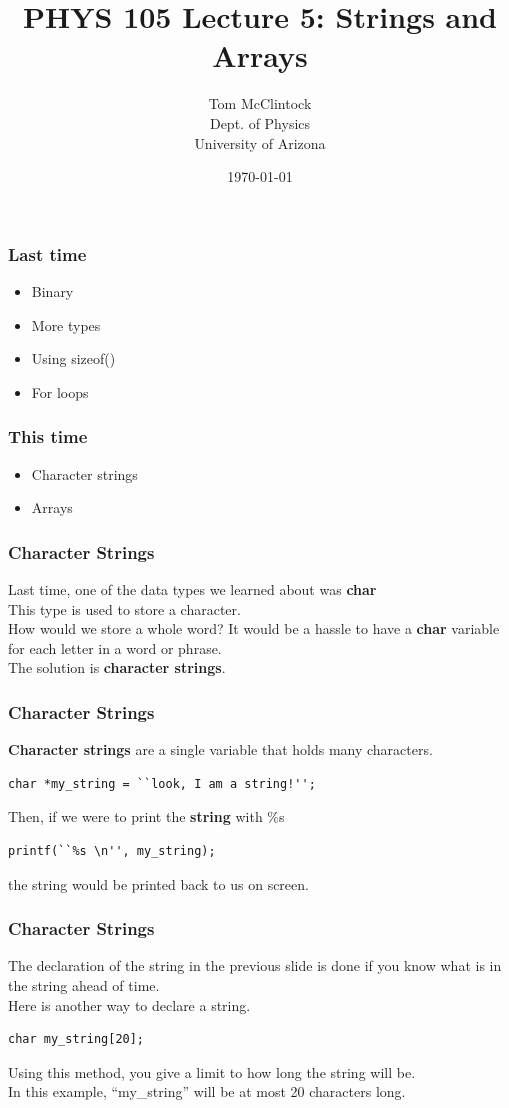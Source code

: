 \documentclass{beamer}
\title{PHYS 105 Lecture 5: Strings and Arrays}
\author{Tom McClintock \\
	Dept. of Physics\\
	University of Arizona
}
\date{\today}
\begin{document}
\begin{frame}
  \titlepage
\end{frame}

\begin{frame}
  \frametitle{Last time}
  \begin{itemize}
    \item Binary
    \item More types
    \item Using sizeof()
    \item For loops
  \end{itemize}
\end{frame}

\begin{frame}
  \frametitle{This time}
  \begin{itemize}
    \item Character strings
    \item Arrays
  \end{itemize}
\end{frame}

\begin{frame}
  \frametitle{Character Strings}
  Last time, one of the data types we learned about was \textbf{char}\\
  This type is used to store a character.\\
  How would we store a whole word? It would be a hassle to have a \textbf{char}
  variable for each letter in a word or phrase.\\
  The solution is \textbf{character strings}.
\end{frame}

\begin{frame}[fragile]
  \frametitle{Character Strings}
  \textbf{Character strings} are a single variable that holds many characters.\\
  \begin{lstlisting}[style=customc]
    char *my_string = ``look, I am a string!'';
  \end{lstlisting}
  Then, if we were to print the \textbf{string} with \%s
  \begin{lstlisting}[style=customc]
    printf(``%s \n'', my_string);
  \end{lstlisting}
  the string would be printed back to us on screen.
\end{frame}

\begin{frame}[fragile]
  \frametitle{Character Strings}
  The declaration of the string in the previous slide is done if you
  know what is in the string ahead of time.\\
  Here is another way to declare a string.
  \begin{lstlisting}[style=customc]
    char my_string[20];
  \end{lstlisting}
  Using this method, you give a limit to how long the string will be.\\
  In this example, ``my\_string'' will be at most 20 characters long.
\end{frame}
\end{document}
